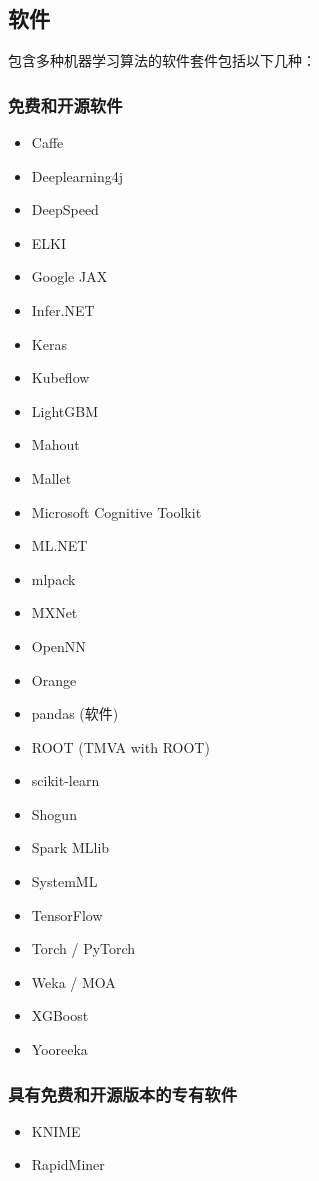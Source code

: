 \subsection{软件}  
包含多种机器学习算法的软件套件包括以下几种：
\subsubsection{免费和开源软件}  
\begin{itemize}
\item Caffe  
\item Deeplearning4j  
\item DeepSpeed  
\item ELKI  
\item Google JAX  
\item Infer.NET  
\item Keras  
\item Kubeflow  
\item LightGBM  
\item Mahout  
\item Mallet  
\item Microsoft Cognitive Toolkit  
\item ML.NET  
\item mlpack  
\item MXNet  
\item OpenNN  
\item Orange  
\item pandas (软件)  
\item ROOT (TMVA with ROOT)  
\item scikit-learn  
\item Shogun  
\item Spark MLlib  
\item SystemML  
\item TensorFlow  
\item Torch / PyTorch  
\item Weka / MOA  
\item XGBoost  
\item Yooreeka
\end{itemize}
\subsubsection{具有免费和开源版本的专有软件 } 
\begin{itemize}
\item KNIME  
\item RapidMiner
\end{itemize}  
